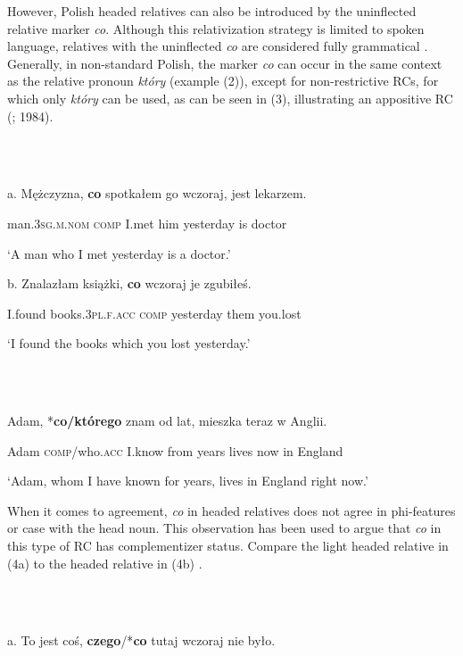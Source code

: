 \documentclass[output=paper]{langsci/langscibook}
\begin{document}
However, Polish headed relatives can also be introduced by the uninflected relative marker \textit{co}. Although this relativization strategy is limited to spoken language, relatives with the uninflected \textit{co} are considered fully grammatical \citep{ButtlerEtAl1971}. Generally, in non-standard Polish, the marker \textit{co} can occur in the same context as the relative pronoun \textit{który} (example (2)), except for non-restrictive RCs, for which only \textit{który} can be used, as can be seen in (3), illustrating an appositive RC (\citealt{Borsley1981}; 1984).

\ea%
    \label{ex:key:2}
    \gll\\
        \\
    \glt
    \z

          a.   Mężczyzna, \textbf{co} spotkałem go wczoraj, jest lekarzem.

    man.\textsc{3sg.m.nom comp} I.met him yesterday is doctor

    ‘A man who I met yesterday is a doctor.’

  b.   Znalazłam   książki, \textbf{co} wczoraj   je zgubiłeś. 

    I.found books.\textsc{3pl.f.acc comp}\textsubscript{} yesterday them you.lost

    ‘I found the books which you lost yesterday.’

\ea%
    \label{ex:key:3}
    \gll\\
        \\
    \glt
    \z

          Adam, *\textbf{co/którego} znam od lat, mieszka teraz w Anglii.    

Adam \textsc{comp}/who\textsc{.acc} I.know from years lives now in England

  ‘Adam, whom I have known for years, lives in England right now.’

When it comes to agreement, \textit{co} in headed relatives does not agree in phi-features or case with the head noun. This observation has been used to argue that \textit{co} in this type of RC has complementizer status. Compare the light headed relative in (4a) to the headed relative in (4b) \citep{Citko2004}.

\ea%
    \label{ex:key:4}
    \gll\\
        \\
    \glt
    \z

          a.   To   jest   coś,   \textbf{czego}/*\textbf{co}   tutaj  wczoraj    nie   było.   
\end{document}
